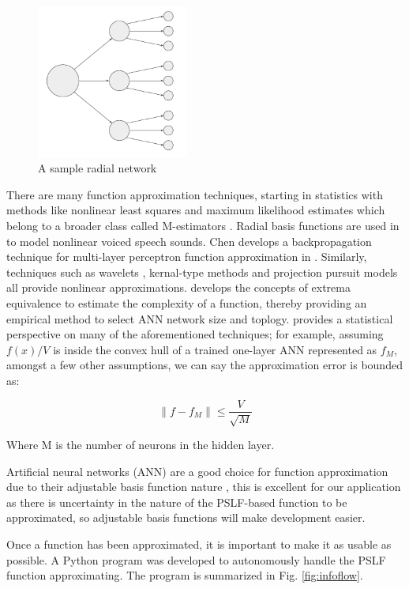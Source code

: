 \documentclass[conference]{IEEEtran}
\begin{document}
\begin{figure}[h]
	\centering
	\includegraphics[width=5cm]{radialnetwork.pdf}
	\caption{A sample radial network}
	\label{fig:radnetwork}
\end{figure}

There are many function approximation techniques, starting in statistics with methods like nonlinear least squares and maximum likelihood estimates which belong to a broader class called M-estimators \cite{haya2000}. Radial basis functions are used in \cite{mann1999} to model nonlinear voiced speech sounds. Chen develops a backpropagation technique for multi-layer perceptron function approximation in \cite{chen1994}. Similarly, techniques such as wavelets \cite{zhang1992}, kernal-type methods \cite{lowe1991} and projection pursuit models \cite{fried1981} all provide nonlinear approximations. \cite{zhang2004} develops the concepts of extrema equivalence to estimate the complexity of a function, thereby providing an empirical method to select ANN network size and toplogy. \cite{cheng1994} provides a statistical perspective on many of the aforementioned techniques; for example, assuming $f(x)/V$ is inside the convex hull of a trained one-layer ANN represented as $f_{M}$, amongst a few other assumptions, we can say the approximation error is bounded as:

\begin{equation} \|f - f_{M}\| \leqslant \frac{V}{\sqrt{M}} \label{form:1layerannbound} \end{equation}

\noindent Where M is the number of neurons in the hidden layer.

Artificial neural networks (ANN) are a good choice for function approximation due to their adjustable basis function nature \cite{barr1994}, this is excellent for our application as there is uncertainty in the nature of the PSLF-based function to be approximated, so adjustable basis functions will make development easier.

Once a function has been approximated, it is important to make it as usable as possible. A Python program was developed to autonomously handle the PSLF function approximating. The program is summarized in Fig. \ref{fig:infoflow}.
\end{document}
